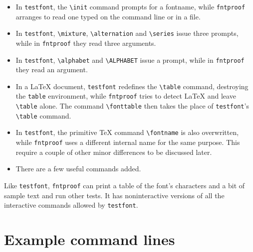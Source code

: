\documentclass[draft]{article}
\newcommand\file[1]{\texttt{#1}}
\newcommand\env[1]{\texttt{#1}}
\renewcommand\"{\verb"}
\begin{document}
\begin{itemize}
  \item In \file{testfont}, the \"\init" command prompts for a fontname, 
        while \file{fntproof} arranges to read one typed on the command 
        line or in a file.

  \item In \file{testfont}, \"\mixture", \"\alternation" and \"\series" 
        issue three prompts, while in \file{fntproof} they read three 
        arguments.

  \item In \file{testfont}, \"\alphabet" and \"\ALPHABET" issue a
        prompt, while in \file{fntproof} they read an argument.

  \item In a \LaTeX{} document, \file{testfont} redefines the \"\table"
        command, destroying the \env{table} environment, while
        \file{fntproof} tries to detect \LaTeX{} and leave \"\table" 
        alone. The command \"\fonttable" then takes the place of 
        \file{testfont}'s \"\table" command.

  \item In \file{testfont}, the primitive \TeX{} command \"\fontname" is 
        also overwritten, while \file{fntproof} uses a different 
        internal name for the same purpose. This require a couple of 
        other minor differences to be discussed later.

  \item There are a few useful commands added.
\end{itemize}

Like \file{testfont}, \file{fntproof} can print a table of the font's 
characters and a bit of sample text and run other tests. It has 
noninteractive versions of all the interactive commands allowed by 
\file{testfont}.


\section{Example command lines}\label{examples}
\end{document}
